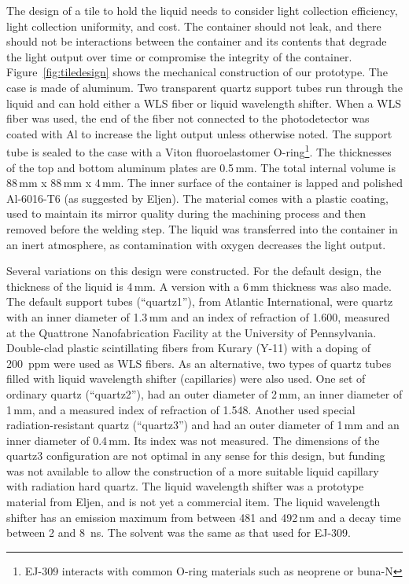 \documentclass[review]{elsarticle}
\begin{document}
The design of a tile to hold the liquid needs to consider light
collection efficiency, light collection uniformity, and cost. The
container should not leak, and there should not be interactions
between the container and its contents that degrade the light output
over time or compromise the integrity of the
container. 
Figure~\ref{fig:tiledesign} shows the mechanical
construction of our prototype. The case is made of aluminum. Two
transparent quartz support tubes
run through the
liquid and can hold either a WLS fiber or liquid
wavelength shifter.
When a WLS fiber was
used, the end of the fiber not connected to the photodetector was
coated with Al to increase the light output unless otherwise
noted. The support tube is sealed to the case with a Viton
fluoroelastomer O-ring\footnote{EJ-309 interacts with common O-ring materials
such as neoprene or buna-N}. 
The thicknesses of the top and bottom aluminum
plates are 0.5\,mm. The total internal volume is 88\,mm x 88\,mm x
4\,mm. The inner surface of the container is lapped and polished
Al-6016-T6 (as suggested by Eljen). The material comes with a
plastic coating, used to maintain its mirror quality during
the machining process and then removed before the welding step. The
liquid was transferred into the container in an inert atmosphere, as
contamination with oxygen decreases the light output.

Several variations on this design were constructed. For the default
design, the thickness of the liquid is 4\,mm. A version with a 6\,mm
thickness was also made. The default
support tubes (``quartz1''), from Atlantic International, were quartz with an inner
diameter of 1.3\,mm and
an index of refraction of 1.600,
 measured at the Quattrone
Nanofabrication Facility at the University of Pennsylvania.
Double-clad plastic scintillating fibers from Kurary (Y-11)  with  a doping of
200~ppm were used as WLS fibers.
As an alternative, two types of
quartz tubes filled with liquid wavelength
shifter (capillaries) were also used.  
One set  of ordinary quartz (``quartz2''),
 had an outer diameter of 2\,mm,
an inner diameter of 1\,mm, and a measured index of refraction of 1.548.
Another used special radiation-resistant quartz (``quartz3'')
and had an outer diameter of 1\,mm and an
inner diameter of 0.4\,mm.  Its index was not measured.
The dimensions of the quartz3 configuration are not optimal in any sense for this design, but
funding was not available to allow the construction of a more
suitable liquid capillary with radiation hard quartz.
The liquid wavelength shifter was a prototype
material from Eljen, and is not yet a commercial item. The liquid
wavelength shifter has an emission maximum from between 481 and 492\,nm
and a decay time between 2 and 8~ns. The solvent was the same as that
used for EJ-309. 
\end{document}
